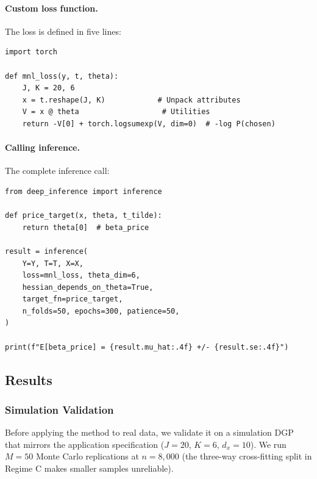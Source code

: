\paragraph{Custom loss function.} The loss is defined in five lines:

\begin{lstlisting}
import torch

def mnl_loss(y, t, theta):
    J, K = 20, 6
    x = t.reshape(J, K)            # Unpack attributes
    V = x @ theta                   # Utilities
    return -V[0] + torch.logsumexp(V, dim=0)  # -log P(chosen)
\end{lstlisting}

\paragraph{Calling inference.} The complete inference call:

\begin{lstlisting}
from deep_inference import inference

def price_target(x, theta, t_tilde):
    return theta[0]  # beta_price

result = inference(
    Y=Y, T=T, X=X,
    loss=mnl_loss, theta_dim=6,
    hessian_depends_on_theta=True,
    target_fn=price_target,
    n_folds=50, epochs=300, patience=50,
)

print(f"E[beta_price] = {result.mu_hat:.4f} +/- {result.se:.4f}")
\end{lstlisting}

\subsection{Results}

\subsubsection{Simulation Validation}

Before applying the method to real data, we validate it on a simulation DGP that mirrors the application specification ($J = 20$, $K = 6$, $d_x = 10$). We run $M = 50$ Monte Carlo replications at $n = 8{,}000$ (the three-way cross-fitting split in Regime C makes smaller samples unreliable).


